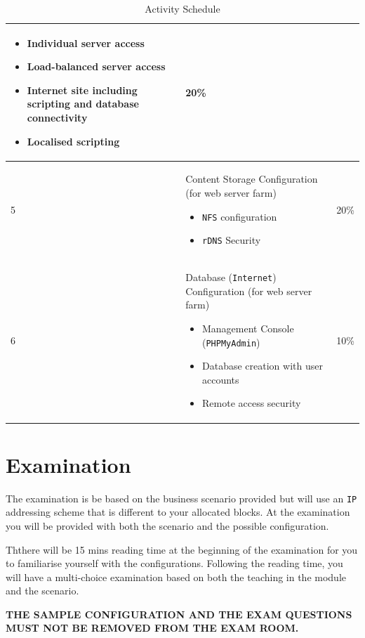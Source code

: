 \documentclass[11pt]{article}
\begin{document}
\begin{table}[ht]
\begin{tabular}{|p{1cm}|p{14cm}|p{1cm}|}
\begin{itemize}
              \item Individual server access
              \item Load-balanced server access
              \item Internet site including scripting and database connectivity
              \item Localised scripting
            \end{itemize} 
      & 20\%\\
      \hline
      5 & Content Storage Configuration (for web server farm)
          \begin{itemize}
            \item \texttt{NFS} configuration
            \item \texttt{rDNS} Security
          \end{itemize} 
      & 20\%\\
      \hline
      6 & Database (\texttt{Internet}) Configuration (for web server farm)
          \begin{itemize}
            \item Management Console (\texttt{PHPMyAdmin})
            \item Database creation with user accounts
            \item Remote access security
          \end{itemize}
      & 10\%\\
      \hline
    \end{tabular}
    \caption{Activity Schedule}
\end{table}

\section{Examination}

\noindent The examination is be based on the business scenario provided but will use an \texttt{IP} addressing scheme that is different to your allocated blocks. 
At the examination you will be provided with both the scenario and the possible configuration.

\noindent Ththere will be 15 mins reading time at the beginning of the examination for you to familiarise yourself with the configurations. 
Following the reading time, you will have a multi-choice examination based on both the teaching in the module and the scenario.

\begin{tcolorbox}[title={\textbf{NOTE:}}]
  \noindent \textbf{THE SAMPLE CONFIGURATION AND THE EXAM QUESTIONS MUST NOT BE REMOVED FROM THE EXAM ROOM.}
\end{tcolorbox}
\end{document}
